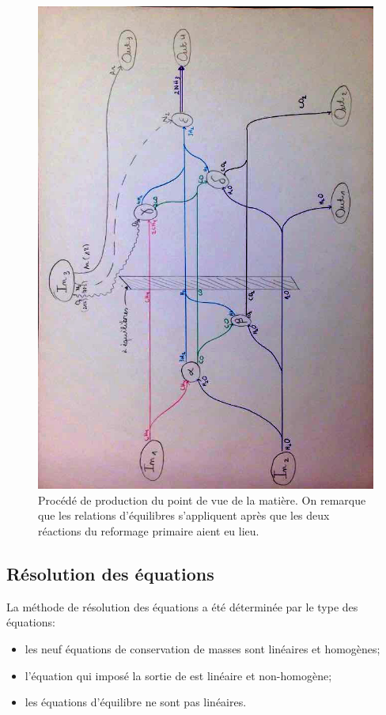 \documentclass[a4paper,12pt]{article}
\begin{document}
\begin{figure}
    \centering
    \includegraphics[width=.9\textwidth]{flows_matter}
    \caption{
        Procédé de production du point de vue de la matière.
        On remarque que les relations d'équilibres s'appliquent après que les deux
        réactions du reformage primaire aient eu lieu.
    }
    \label{fig:flows-matter}
\end{figure}

\subsection{Résolution des équations}

La méthode de résolution des équations a été déterminée par le type des équations:
\begin{itemize}
    \item les neuf équations de conservation de masses sont linéaires et homogènes;
    \item l'équation qui imposé la sortie de  est linéaire et non-homogène;
    \item les équations d'équilibre ne sont pas linéaires.
\end{itemize}
\end{document}
